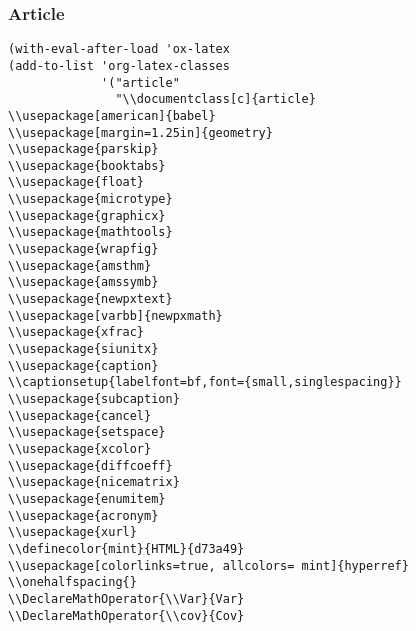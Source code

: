 \documentclass[c]{article}
\DeclareMathOperator{\Var}{Var}
\DeclareMathOperator{\cov}{Cov}
\theoremstyle{plain}%
\theoremstyle{definition}
\theoremstyle{remark}
\begin{document}
\subsubsection{Article}
\label{sec:org462eb65}
\begin{verbatim}
(with-eval-after-load 'ox-latex
(add-to-list 'org-latex-classes
             '("article"
               "\\documentclass[c]{article}
\\usepackage[american]{babel}
\\usepackage[margin=1.25in]{geometry}
\\usepackage{parskip}
\\usepackage{booktabs}
\\usepackage{float}
\\usepackage{microtype}
\\usepackage{graphicx}
\\usepackage{mathtools}
\\usepackage{wrapfig}
\\usepackage{amsthm}
\\usepackage{amssymb}
\\usepackage{newpxtext}
\\usepackage[varbb]{newpxmath}
\\usepackage{xfrac}
\\usepackage{siunitx}
\\usepackage{caption}
\\captionsetup{labelfont=bf,font={small,singlespacing}}
\\usepackage{subcaption}
\\usepackage{cancel}
\\usepackage{setspace}
\\usepackage{xcolor}
\\usepackage{diffcoeff}
\\usepackage{nicematrix}
\\usepackage{enumitem}
\\usepackage{acronym}
\\usepackage{xurl}
\\definecolor{mint}{HTML}{d73a49}
\\usepackage[colorlinks=true, allcolors= mint]{hyperref}
\\onehalfspacing{}
\\DeclareMathOperator{\\Var}{Var}
\\DeclareMathOperator{\\cov}{Cov}

\end{verbatim}
\end{document}
